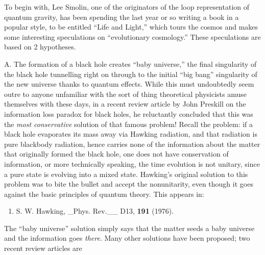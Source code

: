 \documentclass{article}
\def\tightlist{}
\renewcommand{\texttt}[1]{%
  \begingroup
  \ttfamily
  \begingroup\lccode`~=`/\lowercase{\endgroup\def~}{/\discretionary{}{}{}}%
  \begingroup\lccode`~=`[\lowercase{\endgroup\def~}{[\discretionary{}{}{}}%
  \begingroup\lccode`~=`.\lowercase{\endgroup\def~}{.\discretionary{}{}{}}%
  \catcode`/=\active\catcode`[=\active\catcode`.=\active
  \scantokens{#1\noexpand}%
  \endgroup
}
\begin{document}
To begin with, Lee Smolin, one of the originators of the loop
representation of quantum gravity, has been spending the last year or so
writing a book in a popular style, to be entitled ``Life and Light,''
which tours the cosmos and makes some interesting speculations on
``evolutionary cosmology.'' These speculations are based on 2
hypotheses.

A. The formation of a black hole creates ``baby universe,'' the final
singularity of the black hole tunnelling right on through to the initial
``big bang'' singularity of the new universe thanks to quantum effects.
While this must undoubtedly seem outre to anyone unfamiliar with the
sort of thing theoretical physicists amuse themselves with these days,
in a recent review article by John Preskill on the information loss
paradox for black holes, he reluctantly concluded that this was the
\emph{most conservative} solution of that famous problem! Recall the
problem: if a black hole evaporates its mass away via Hawking radiation,
and that radiation is pure blackbody radiation, hence carries none of
the information about the matter that originally formed the black hole,
one does not have conservation of information, or more technically
speaking, the time evolution is not unitary, since a pure state is
evolving into a mixed state. Hawking's original solution to this problem
was to bite the bullet and accept the nonunitarity, even though it goes
against the basic principles of quantum theory. This appears in:

\begin{enumerate}
\def\labelenumi{\arabic{enumi})}
\setcounter{enumi}{1}
\tightlist
\item
  S. W. Hawking, \_Phys. Rev.\_\_ D13, \textbf{191} (1976).
\end{enumerate}

The ``baby universe'' solution simply says that the matter seeds a baby
universe and the information goes \emph{there}. Many other solutions
have been proposed; two recent review articles are

\end{document}
